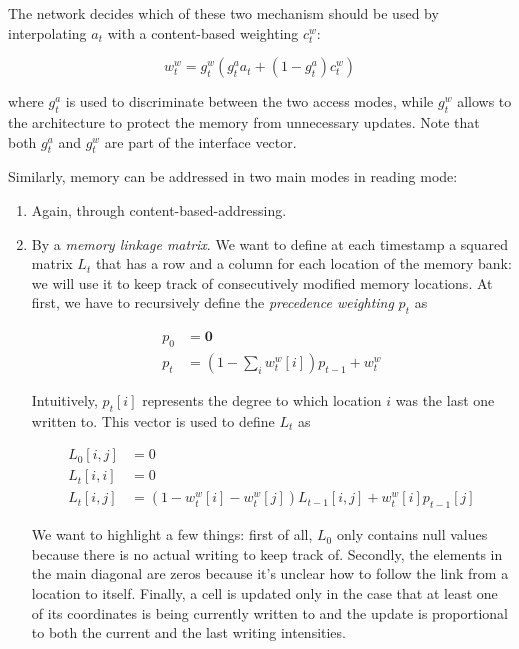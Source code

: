 \documentclass{article}
\begin{document}
The network decides which of these two mechanism should be used by interpolating $a_t$ with a content-based weighting $c_t^w$:

\begin{equation}
    w_t^w = g_t^w(g_t^a a_t + (1-g_t^a)c_t^w)
\end{equation}

where $g_t^a$ is used to discriminate between the two access modes, while $g_t^w$ allows to the architecture to protect the memory from unnecessary updates. Note that both $g_t^a$ and $g_t^w$ are part of the interface vector.

Similarly, memory can be addressed in two main modes in reading mode:

\begin{enumerate}
    \item Again, through content-based-addressing.
    \item By a \textit{memory linkage matrix}. We want to define at each timestamp a squared matrix $L_t$ that has a row and a column for each location of the memory bank: we will use it to keep track of consecutively modified memory locations. At first, we have to recursively define the \textit{precedence weighting} $p_t$ as

    \begin{align}
        p_0 &= \mathbf{0}\\
        p_t &= ( 1 - \sum_i w_t^w[i] ) p_{t-1} + w_t^w
    \end{align}

    Intuitively, $p_t[i]$ represents the degree to which location $i$ was the last one written to. This vector is used to define $L_t$ as

    \begin{align}
        L_0[i,j] &= 0\\
        L_t[i,i] &= 0\\
        L_t[i,j] &= (1-w_t^w[i]-w_t^w[j])L_{t-1}[i,j]+w_t^w[i]p_{t-1}[j]
    \end{align}

    We want to highlight a few things: first of all, $L_0$ only contains null values because there is no actual writing to keep track of. Secondly, the elements in the main diagonal are zeros because it's unclear how to follow the link from a location to itself. Finally, a cell is updated only in the case that at least one of its coordinates is being currently written to and the update is proportional to both the current and the last writing intensities. 


\end{enumerate}
\end{document}
